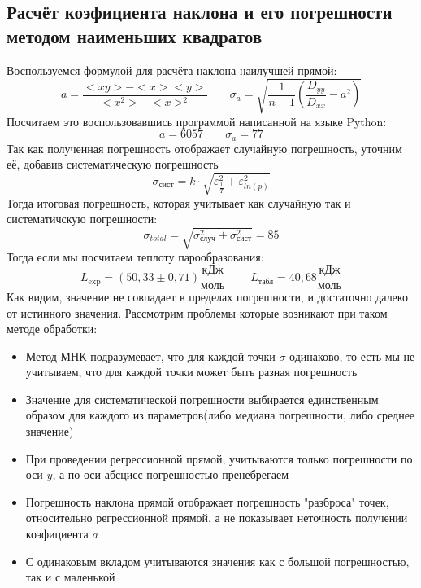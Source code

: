 \documentclass[a4paper,20pt]{article}
\theoremstyle{definition}
\begin{document}
\subsection{Расчёт коэфициента наклона и его погрешности методом наименьших квадратов}
Воспользуемся формулой для расчёта наклона наилучшей прямой:
\begin{equation}
	a = \frac{<xy> - <x><y>}{<x^2>-<x>^2} \;\;\;\;\;\;\; \sigma_a = \sqrt{\frac{1}{n-1}(\frac{D_{yy}}{D_{xx}} - a^2)} 
\end{equation}
Посчитаем это воспользовавшись программой написанной на языке Python:
\begin{equation}
	a = 6057 \;\;\;\;\;\;\; \sigma_a = 77 
\end{equation}
Так как полученная погрешность отображает случайную погрешность, уточним её, добавив систематическую погрешность
\begin{equation}
	\sigma_{\text{сист}} = k \cdot \sqrt{\varepsilon_{\frac{1}{T}}^2 + \varepsilon_{ln(p)}^2}
\end{equation}
Тогда итоговая погрешность, которая учитывает как случайную так и систематичскую погрешности:
\begin{equation}
	\sigma_{total} = \sqrt{\sigma_{\text{случ}}^2 + \sigma_{\text{сист}}^2} = 85
\end{equation}
Тогда если мы посчитаем теплоту парообразования:
\begin{equation}
	L_{\text{exp}} = (50,33 \pm 0,71 ) \frac{\text{кДж}}{\text{моль}} \;\;\;\;\;\;\;\; L_{\text{табл}} = 40,68 \frac{\text{кДж}}{\text{моль}}  
\end{equation}
Как видим, значение не совпадает в пределах погрешности, и достаточно далеко от истинного значения. Рассмотрим проблемы которые возникают при таком методе обработки:
\begin{itemize}
	\item Метод МНК подразумевает, что для каждой точки $\sigma$ одинаково, то есть мы не учитываем, что для каждой
точки может быть разная погрешность
	\item Значение для систематической погрешности выбирается единственным образом для каждого из параметров(либо медиана погрешности, либо среднее значение)
	\item При проведении регрессионной прямой, учитываются только погрешности по оси $y$, а по оси абсцисс погрешностью пренебрегаем
	\item Погрешность наклона прямой отображает погрешность "разброса" точек, относительно регрессионной прямой, а не показывает неточность получении коэфициента $a$
	\item С одинаковым вкладом учитываются значения как с большой погрешностью, так и с маленькой
\end{itemize}
\end{document}
